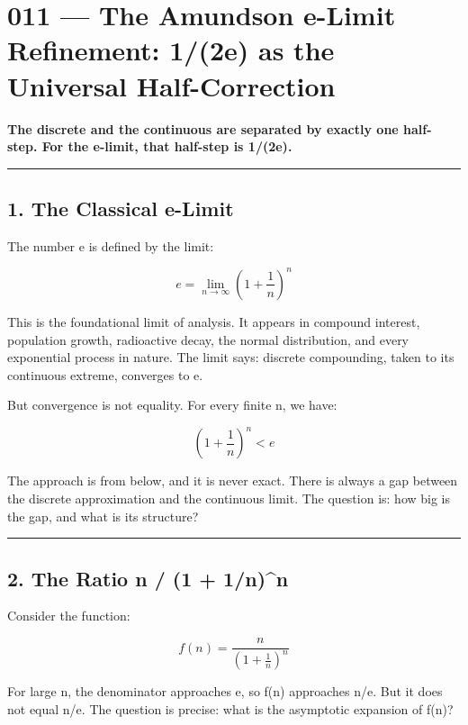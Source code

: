 \documentclass[
]{article}
\author{}
\date{}
\begin{document}
\section{011 --- The Amundson e-Limit Refinement: 1/(2e) as the
Universal
Half-Correction}\label{the-amundson-e-limit-refinement-12e-as-the-universal-half-correction}

\textbf{The discrete and the continuous are separated by exactly one
half-step. For the e-limit, that half-step is 1/(2e).}

\begin{center}\rule{0.5\linewidth}{0.5pt}\end{center}

\subsection{1. The Classical e-Limit}\label{the-classical-e-limit}

The number e is defined by the limit:

\[e = \lim_{n \to \infty} \left(1 + \frac{1}{n}\right)^n\]

This is the foundational limit of analysis. It appears in compound
interest, population growth, radioactive decay, the normal distribution,
and every exponential process in nature. The limit says: discrete
compounding, taken to its continuous extreme, converges to e.

But convergence is not equality. For every finite n, we have:

\[\left(1 + \frac{1}{n}\right)^n < e\]

The approach is from below, and it is never exact. There is always a gap
between the discrete approximation and the continuous limit. The
question is: how big is the gap, and what is its structure?

\begin{center}\rule{0.5\linewidth}{0.5pt}\end{center}

\subsection{2. The Ratio n / (1 + 1/n)\^{}n}\label{the-ratio-n-1-1nn}

Consider the function:

\[f(n) = \frac{n}{\left(1 + \frac{1}{n}\right)^n}\]

For large n, the denominator approaches e, so f(n) approaches n/e. But
it does not equal n/e. The question is precise: what is the asymptotic
expansion of f(n)?
\end{document}
